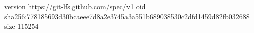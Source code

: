 version https://git-lfs.github.com/spec/v1
oid sha256:778185693d30bcaeee7d8a2e3745a3a551b689038530c2dfd1459d82fb032688
size 115254
